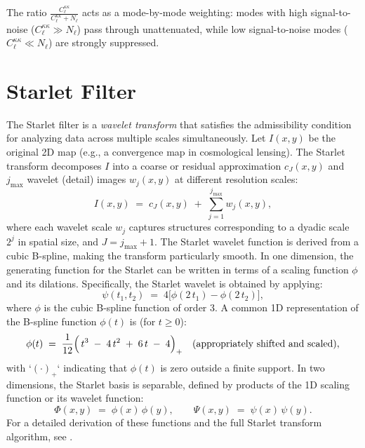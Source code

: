 The ratio \(\frac{C^{\kappa\kappa}_\ell}{C^{\kappa\kappa}_\ell + N_\ell}\) acts as a mode-by-mode weighting: modes with high signal-to-noise (\(C^{\kappa\kappa}_\ell \gg N_\ell\)) pass through unattenuated, while low signal-to-noise modes (\(C^{\kappa\kappa}_\ell \ll N_\ell\)) are strongly 
suppressed.

\section{Starlet Filter}
The Starlet filter is a \emph{wavelet transform} that satisfies the admissibility condition for analyzing data across multiple scales simultaneously. Let \(I(x,y)\) be the original 2D map (e.g., a convergence map in cosmological lensing). The Starlet transform decomposes \(I\) into a coarse or residual approximation \(c_{J}(x,y)\) and \(j_{\max}\) wavelet (detail) images \(w_{j}(x,y)\) at different resolution scales:
\begin{equation}
    I(x,y)
    \;=\;
    c_{J}(x,y)
    \;+\;
    \sum_{j=1}^{j_{\max}} w_{j}(x,y),
    \label{eq:starlet_decomposition}
\end{equation}
where each wavelet scale \(w_{j}\) captures structures corresponding to a dyadic scale \(2^{j}\) in spatial size, and \(J = j_{\max} + 1\). 
The Starlet wavelet function is derived from a cubic B-spline, making the transform particularly smooth. In one dimension, the generating function for the Starlet can be written in terms of a scaling function \(\phi\) and its dilations. Specifically, the Starlet wavelet is obtained by applying:
\begin{equation}
    \psi(t_1, t_2)
    \;=\;
    4 \bigl[\phi(2\,t_1) - \phi(2\,t_2)\bigr],
\end{equation}
where \(\phi\) is the cubic B-spline function of order 3. A common 1D representation of the B-spline function \(\phi(t)\) is (for \(t \ge 0\)):
\begin{equation}
    \phi(t)
    \;=\;
    \frac{1}{12}
    \Bigl(\,
      t^3
      \;-\; 4\,t^2
      \;+\; 6\,t
      \;-\;4
    \Bigr)_+
    \quad\text{(appropriately shifted and scaled)},
    \label{eq:b_spline}
\end{equation}
with `\((\cdot)_+\)` indicating that \(\phi(t)\) is zero outside a finite support. In two dimensions, the Starlet basis is separable, defined by products of the 1D scaling function or its wavelet function:
\begin{equation}
    \Phi(x,y)
    \;=\;
    \phi(x)\,\phi(y), 
    \qquad
    \Psi(x,y)
    \;=\;
    \psi(x)\,\psi(y).
\end{equation}
For a detailed derivation of these functions and the full Starlet transform algorithm, see \citet{Starck_Murtagh_Fadili_2010}.